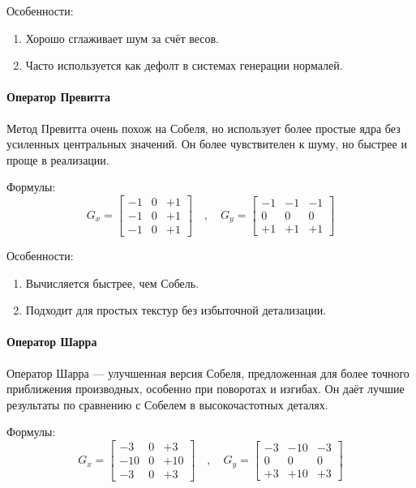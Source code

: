 Особенности:
\begin{enumerate}
	\item Хорошо сглаживает шум за счёт весов.
	\item Часто используется как дефолт в системах генерации нормалей.
\end{enumerate}
\paragraph{Оператор Превитта}

Метод Превитта очень похож на Собеля, но использует более простые ядра без усиленных центральных значений. Он более чувствителен к шуму, но быстрее и проще в реализации.

Формулы:
\[
G_x =
\begin{bmatrix}
	-1 & 0 & +1 \\
	-1 & 0 & +1 \\
	-1 & 0 & +1
\end{bmatrix}
\quad , \quad
G_y =
\begin{bmatrix}
	-1 & -1 & -1 \\
	0 & 0 & 0 \\
	+1 & +1 & +1
\end{bmatrix}
\]

Особенности:
\begin{enumerate}
	\item Вычисляется быстрее, чем Собель.
	\item Подходит для простых текстур без избыточной детализации.
\end{enumerate}
\paragraph{Оператор Шарра}

Оператор Шарра — улучшенная версия Собеля, предложенная для более точного приближения производных, особенно при поворотах и изгибах. Он даёт лучшие результаты по сравнению с Собелем в высокочастотных деталях.

Формулы:
\[
G_x =
\begin{bmatrix}
	-3 & 0 & +3 \\
	-10 & 0 & +10 \\
	-3 & 0 & +3
\end{bmatrix}
\quad , \quad
G_y =
\begin{bmatrix}
	-3 & -10 & -3 \\
	0 & 0 & 0 \\
	+3 & +10 & +3
\end{bmatrix}
\]

